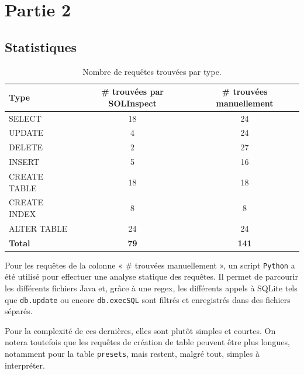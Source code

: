 \section{Partie 2}

\subsection{Statistiques}

\begin{table}[H]
    \centering
    \begin{tabular}{|l|c|c|}
        \hline
        \textbf{Type}  & \textbf{\# trouvées par SOLInspect} & \textbf{\# trouvées manuellement} \\ \hline
        SELECT         & 18                                  & 24                                \\ \hline
        UPDATE         & 4                                   & 24                                \\ \hline
        DELETE         & 2                                   & 27                                \\ \hline
        INSERT         & 5                                   & 16                                \\ \hline
        CREATE TABLE   & 18                                  & 18                                \\ \hline
        CREATE INDEX   & 8                                   & 8                                 \\ \hline
        ALTER TABLE    & 24                                  & 24                                \\ \hline
        \textbf{Total} & \textbf{79}                         & \textbf{141}                      \\ \hline
    \end{tabular}
    \caption{Nombre de requêtes trouvées par type.}
\end{table}

Pour les requêtes de la colonne « \# trouvées manuellement », un script \texttt{Python} a été utilisé pour effectuer une analyse statique des requêtes. Il permet de parcourir les différents fichiers Java et, grâce à une regex, les différents appels à SQLite tels que \texttt{db.update} ou encore \texttt{db.execSQL} sont filtrés et enregistrés dans des fichiers séparés.

Pour la complexité de ces dernières, elles sont plutôt simples et courtes. On notera toutefois que les requêtes de création de table peuvent être plus longues, notamment pour la table \texttt{presets}, mais restent, malgré tout, simples à interpréter.

